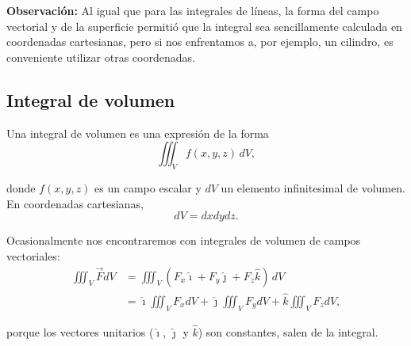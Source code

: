 \textbf{Observación:} Al igual que para las integrales de líneas, la forma del campo vectorial y de la superficie permitió que la integral sea sencillamente calculada en coordenadas cartesianas, pero si nos enfrentamos a, por ejemplo, un cilindro, es conveniente utilizar otras coordenadas.

\subsection{Integral de volumen}

Una integral de volumen es una expresión de la forma
$$\iiint_V f(x,y,z) \,dV,$$

donde $f(x,y,z)$ es un campo escalar y $dV$ un elemento infinitesimal de volumen. En coordenadas cartesianas,
$$dV = dx dy dz.$$

Ocasionalmente nos encontraremos con integrales de volumen de campos vectoriales:
\begin{align*}
  \iiint_V \vec{F} dV &= \iiint_V (F_x \hat{\imath} + F_y \hat{\jmath} + F_z \hat{k}) \,dV\\
  &=\hat{\imath} \iiint_V F_x dV +  \hat{\jmath} \iiint_V F_y dV  + \hat{k} \iiint_V F_z dV, 
\end{align*}

porque los vectores unitarios ($\hat{\imath}$, $\hat{\jmath}$ y $\hat{k}$) son constantes, salen de la integral.


